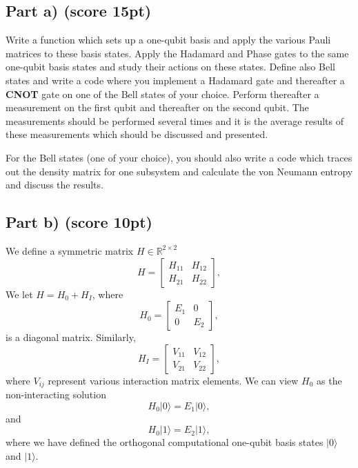 \documentclass[%
oneside,                 %
final,                   %
10pt]{article}
\begin{document}
\subsection*{Part a) (score 15pt)}

Write a function which sets up a one-qubit basis and apply the various
Pauli matrices to these basis states.  Apply the Hadamard and Phase
gates to the same one-qubit basis states and study their actions on
these states. Define also Bell states and write a code where you
implement a Hadamard gate and thereafter a \textbf{CNOT} gate on one of the Bell
states of your choice. Perform thereafter a measurement on the first qubit and
thereafter on the second qubit. The measurements should be performed 
several times and it is the average results of these measurements
which should be discussed and presented.

For the Bell states (one of your choice), you should also write a code
which traces out the density matrix for one subsystem and calculate
the von Neumann entropy and discuss the results.


\subsection*{Part b) (score 10pt)}

We define a  symmetric matrix  $H\in {\mathbb{R}}^{2\times 2}$
\[
H = \begin{bmatrix} H_{11} & H_{12} \\ H_{21} & H_{22}
\end{bmatrix},
\]
We  let $H = H_0 + H_I$, where
\[
H_0= \begin{bmatrix} E_1 & 0 \\ 0 & E_2\end{bmatrix},
\]
is a diagonal matrix. Similarly,
\[
H_I= \begin{bmatrix} V_{11} & V_{12} \\ V_{21} & V_{22}\end{bmatrix},
\]
where $V_{ij}$ represent various interaction matrix elements.
We can view $H_0$ as the non-interacting solution
\begin{equation}
       H_0\vert 0 \rangle =E_1\vert 0 \rangle,
\end{equation}
and
\begin{equation}
       H_0\vert 1\rangle =E_2\vert 1\rangle,
\end{equation}
where we have defined the orthogonal computational one-qubit basis states $\vert 0\rangle$ and $\vert 1\rangle$.
\end{document}
